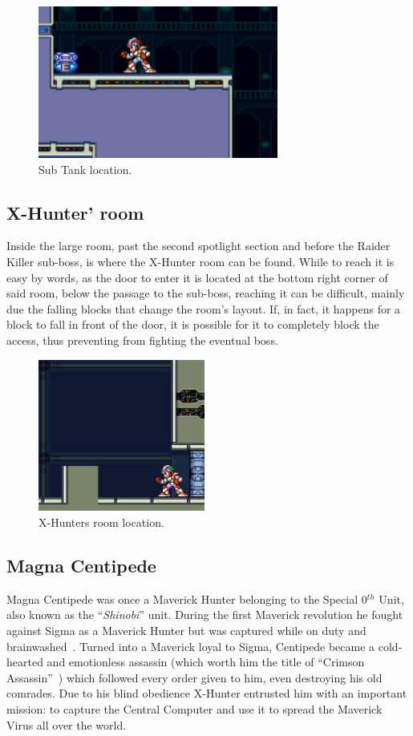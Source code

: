 \begin{figure}[htp]
	\centering
	\includegraphics[height=5cm]{figures/X2/Magna_centipede/Centipede_tank.png}
	\caption{Sub Tank location.}
\end{figure}

\subsection{X-Hunter' room}
Inside the large room, past the second spotlight section and before the Raider Killer sub-boss, is where the X-Hunter room can be found. While to reach it is easy by words, as the door to enter it is located at the bottom right corner of said room, below the passage to the sub-boss, reaching it can be difficult, mainly due the falling blocks that change the room's layout. If, in fact, it happens for a block to fall in front of the door, it is possible for it to completely block the access, thus preventing from fighting the eventual boss. 

\begin{figure}[htp]
	\centering
	\includegraphics[height=5cm]{figures/X2/Magna_centipede/Centipede_Hunter_room.png}
	\caption{X-Hunters room location.}
\end{figure}


\subsection{Magna Centipede}\label{boss:Magna_centipede}
Magna Centipede was once a Maverick Hunter belonging to the Special 0$^{th}$ Unit, also known as the ``\textit{Shinobi}'' unit. During the first Maverick revolution he fought against Sigma as a Maverick Hunter but was captured while on duty and brainwashed~\cite{wayback:X2_resources}. Turned into a Maverick loyal to Sigma, Centipede became a cold-hearted and emotionless assassin (which worth him the title of ``Crimson Assassin''~\cite{book:MMX_Complete_art}) which followed every order given to him, even destroying his old comrades. Due to his blind obedience X-Hunter entrusted him with an important mission: to capture the Central Computer and use it to spread the Maverick Virus all over the world.

